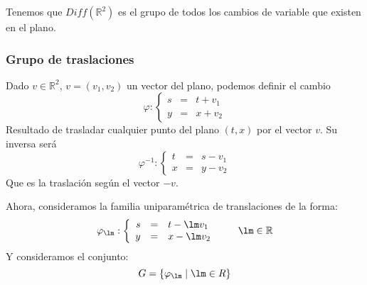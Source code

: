 Tenemos que $Diff(\mathbb{R}^2)$ es el grupo de todos los cambios de variable que existen en el plano.


\subsubsection{Grupo de traslaciones}
Dado $v\in \mathbb{R}^2$, $v=(v_1,v_2)$ un vector del plano, podemos definir el cambio
\begin{equation*}
    \varphi: \left\{\begin{array}{rcl}
            s &= &t + v_1 \\
            y &= &x + v_2
    \end{array}\right.
\end{equation*}
Resultado de trasladar cualquier punto del plano $(t,x)$ por el vector $v$. Su inversa será
\begin{equation*}
    \varphi^{-1}: \left\{\begin{array}{rcl}
            t &= &s - v_1 \\
            x &= &y - v_2
    \end{array}\right.
\end{equation*}
Que es la traslación según el vector $-v$.

Ahora, consideramos la familia uniparamétrica de translaciones de la forma:
\begin{equation*}
    \varphi_{\lm}: \left\{\begin{array}{rcl}
            s &= &t - \lm v_1 \\
            y &= &x - \lm v_2
    \end{array}\right. \qquad \lm \in \mathbb{R}
\end{equation*}
Y consideramos el conjunto:
\begin{equation*}
    G = \{\varphi_{\lm} \mid \lm \in R\}
\end{equation*}

